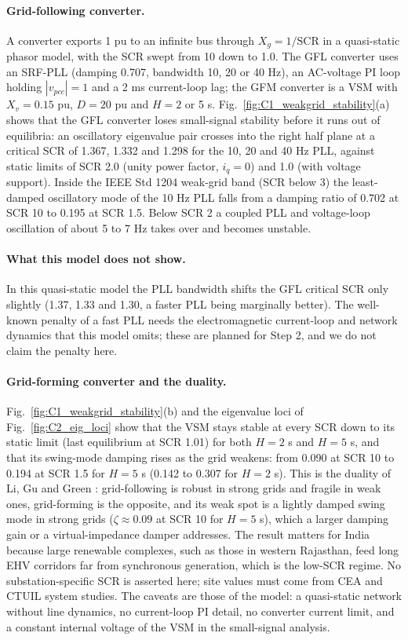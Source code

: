 \paragraph{Grid-following converter.} A converter exports 1 pu to an infinite bus through $X_g=1/\mathrm{SCR}$ in a quasi-static phasor model, with the SCR swept from 10 down to 1.0. The GFL converter uses an SRF-PLL (damping 0.707, bandwidth 10, 20 or 40 Hz), an AC-voltage PI loop holding $|v_{pcc}|=1$ and a 2 ms current-loop lag; the GFM converter is a VSM with $X_v=0.15$ pu, $D=20$ pu and $H=2$ or 5 s. Fig.~\ref{fig:C1_weakgrid_stability}(a) shows that the GFL converter loses small-signal stability before it runs out of equilibria: an oscillatory eigenvalue pair crosses into the right half plane at a critical SCR of 1.367, 1.332 and 1.298 for the 10, 20 and 40 Hz PLL, against static limits of SCR 2.0 (unity power factor, $i_q=0$) and 1.0 (with voltage support). Inside the IEEE Std 1204 weak-grid band (SCR below 3) the least-damped oscillatory mode of the 10 Hz PLL falls from a damping ratio of 0.702 at SCR 10 to 0.195 at SCR 1.5. Below SCR 2 a coupled PLL and voltage-loop oscillation of about 5 to 7 Hz takes over and becomes unstable.

\paragraph{What this model does not show.} In this quasi-static model the PLL bandwidth shifts the GFL critical SCR only slightly (1.37, 1.33 and 1.30, a faster PLL being marginally better). The well-known penalty of a fast PLL needs the electromagnetic current-loop and network dynamics that this model omits; these are planned for Step 2, and we do not claim the penalty here.

\paragraph{Grid-forming converter and the duality.} Fig.~\ref{fig:C1_weakgrid_stability}(b) and the eigenvalue loci of Fig.~\ref{fig:C2_eig_loci} show that the VSM stays stable at every SCR down to its static limit (last equilibrium at SCR 1.01) for both $H=2$ s and $H=5$ s, and that its swing-mode damping rises as the grid weakens: from 0.090 at SCR 10 to 0.194 at SCR 1.5 for $H=5$ s (0.142 to 0.307 for $H=2$ s). This is the duality of Li, Gu and Green \cite{li}: grid-following is robust in strong grids and fragile in weak ones, grid-forming is the opposite, and its weak spot is a lightly damped swing mode in strong grids ($\zeta\approx0.09$ at SCR 10 for $H=5$ s), which a larger damping gain or a virtual-impedance damper addresses. The result matters for India because large renewable complexes, such as those in western Rajasthan, feed long EHV corridors far from synchronous generation, which is the low-SCR regime. No substation-specific SCR is asserted here; site values must come from CEA and CTUIL system studies. The caveats are those of the model: a quasi-static network without line dynamics, no current-loop PI detail, no converter current limit, and a constant internal voltage of the VSM in the small-signal analysis.
